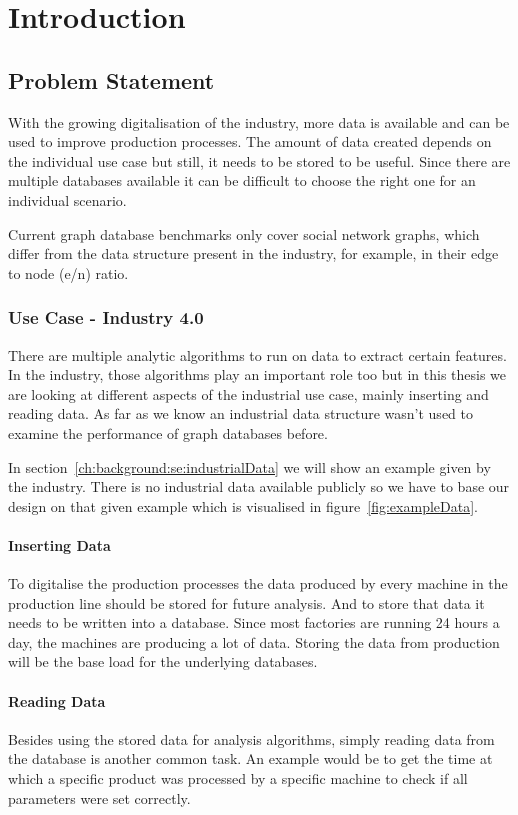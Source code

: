 \chapter{Introduction}
\label{ch:introduction}

\section{Problem Statement}
With the growing digitalisation of the industry,
more data is available and can be used to improve production processes.
The amount of data created depends on the individual use case but still,
it needs to be stored to be useful.
Since there are multiple databases available it can be difficult to choose the right one for an individual scenario.

Current graph database benchmarks only cover social network graphs,
which differ from the data structure present in the industry,
for example,
in their edge to node (e/n) ratio.

\subsection{Use Case - Industry 4.0}
There are multiple analytic algorithms to run on data to extract certain features.
In the industry,
those algorithms play an important role too but in this thesis we are looking at different aspects of the industrial use case,
mainly inserting and reading data.
As far as we know an industrial data structure wasn't used to examine the performance of graph databases before.

In section~\ref{ch:background:se:industrialData} we will show an example given by the industry.
There is no industrial data available publicly so we have to base our design on that given example which is visualised in figure~\ref{fig:exampleData}.

\subsubsection{Inserting Data}
To digitalise the production processes the data produced by every machine in the production line should be stored for future analysis.
And to store that data it needs to be written into a database.
Since most factories are running 24 hours a day,
the machines are producing a lot of data.
Storing the data from production will be the base load for the underlying databases.

\subsubsection{Reading Data}
Besides using the stored data for analysis algorithms,
simply reading data from the database is another common task.
An example would be to get the time at which a specific product was processed by a specific machine to check if all parameters were set correctly.

